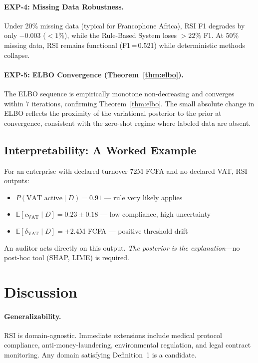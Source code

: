 \documentclass[letterpaper]{article}
\begin{document}
\paragraph{EXP-4: Missing Data Robustness.}
Under 20\% missing data (typical for Francophone Africa), RSI F1
degrades by only $-0.003$ ($< 1\%$), while the Rule-Based System
loses $> 22\%$ F1. At 50\% missing data, RSI remains functional
(F1\,=\,0.521) while deterministic methods collapse.

\paragraph{EXP-5: ELBO Convergence (Theorem~\ref{thm:elbo}).}
The ELBO sequence is empirically monotone non-decreasing and converges
within 7 iterations, confirming Theorem~\ref{thm:elbo}. The small
absolute change in ELBO reflects the proximity of the variational
posterior to the prior at convergence, consistent with the
zero-shot regime where labeled data are absent.

\subsection{Interpretability: A Worked Example}

For an enterprise with declared turnover 72M FCFA and no declared VAT,
RSI outputs:
\begin{itemize}[leftmargin=2em]
  \item $P(\text{VAT active} \mid D) = 0.91$ --- rule very likely applies
  \item $\mathbb{E}[c_{\mathrm{VAT}} \mid D] = 0.23 \pm 0.18$ --- low compliance, high uncertainty
  \item $\mathbb{E}[\delta_{\mathrm{VAT}} \mid D] = +2.4$M FCFA --- positive threshold drift
\end{itemize}
An auditor acts directly on this output.
\emph{The posterior is the explanation}---no post-hoc tool (SHAP,
LIME) is required.

\section{Discussion}
\label{sec:discussion}

\paragraph{Generalizability.}
RSI is domain-agnostic. Immediate extensions include medical protocol
compliance, anti-money-laundering, environmental regulation, and
legal contract monitoring. Any domain satisfying Definition~1 is
a candidate.
\end{document}

